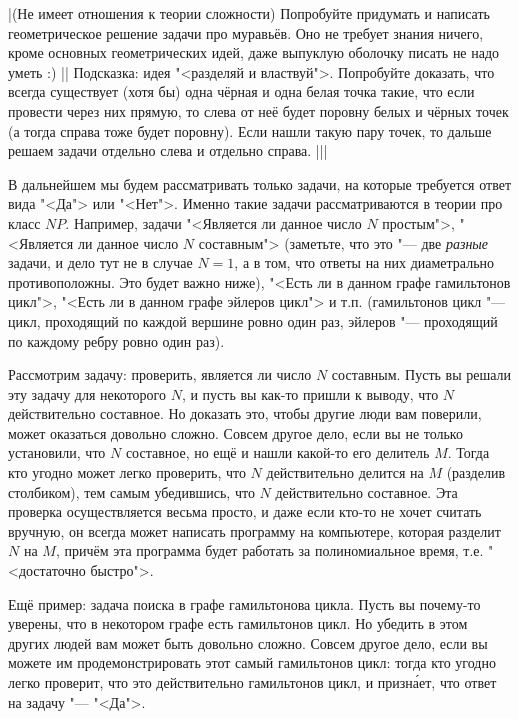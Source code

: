 \documentclass[a4paper,10pt]{problems}
\begin{document}
\task|(Не имеет отношения к теории сложности) Попробуйте придумать и написать геометрическое решение задачи про муравьёв. Оно не требует знания 
ничего, кроме основных геометрических идей, даже выпуклую оболочку писать не 
надо уметь :)
||
Подсказка: идея "<разделяй и властвуй">. Попробуйте 
доказать, что всегда существует (хотя бы) одна чёрная и одна белая точка такие, что если 
провести через них прямую, то слева от неё будет поровну белых и чёрных точек 
(а тогда справа тоже будет поровну). Если нашли такую пару точек, то дальше 
решаем задачи отдельно слева и отдельно справа.
|||

 В дальнейшем мы будем 
рассматривать только задачи, на которые требуется ответ вида "<Да"> или 
"<Нет">. Именно такие задачи рассматриваются в теории про класс $NP$. Например, 
задачи "<Является ли данное число $N$ простым">, "<Является ли данное число $N$ 
составным"> (заметьте, что это "--- две \textit{разные} задачи, и дело тут не в 
случае $N=1$, а в том, что ответы на них 
диаметрально противоположны. Это будет важно ниже), "<Есть ли в данном графе 
гамильтонов цикл">, "<Есть ли в данном графе эйлеров цикл"> и т.п. (гамильтонов 
цикл "--- цикл, проходящий по каждой вершине ровно один раз, эйлеров "--- 
проходящий по каждому ребру ровно один раз).

 Рассмотрим задачу: проверить, является ли число $N$ составным. 
Пусть вы решали эту задачу для некоторого $N$, и пусть вы как-то пришли к 
выводу, что $N$ действительно составное. Но доказать это, чтобы другие люди вам 
поверили, может оказаться довольно сложно. Совсем другое дело, если вы не 
только установили, что $N$ составное, но ещё и нашли какой-то его делитель $M$. 
Тогда кто угодно может легко проверить, что $N$ действительно делится на $M$ 
(разделив столбиком), тем самым убедившись, что $N$ действительно составное. 
Эта проверка осуществляется весьма просто, и даже если кто-то не хочет считать 
вручную, он всегда может написать программу на компьютере, которая разделит $N$ 
на $M$, причём эта программа будет работать за полиномиальное время, т.е. 
"<достаточно быстро">.

Ещё пример: задача поиска в графе гамильтонова цикла. Пусть вы почему-то 
уверены, что в некотором графе есть гамильтонов цикл. Но убедить в этом других 
людей вам может быть довольно сложно. Совсем другое дело, если вы можете им 
продемонстрировать этот самый гамильтонов цикл: тогда кто угодно легко 
проверит, что это действительно гамильтонов цикл, и призн\'{а}ет, что ответ на 
задачу "--- "<Да">.
\end{document}
